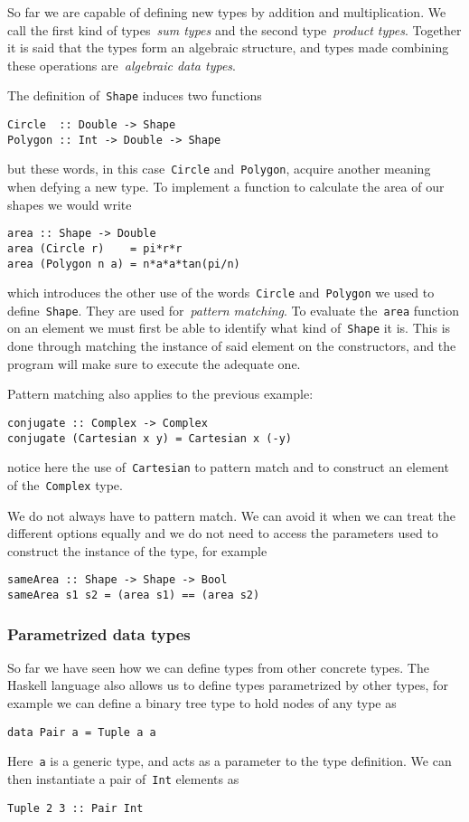\documentclass[../TFG.tex]{subfiles}
\begin{document}
So far we are capable of defining new types by addition and multiplication. We
call the first kind of types~\emph{sum types} and the second type~\emph{product
types}. Together it is said that the types form an algebraic structure, and
types made combining these operations are~\emph{algebraic data types}.

The definition of~\texttt{Shape} induces two functions
\begin{verbatim}
Circle  :: Double -> Shape
Polygon :: Int -> Double -> Shape
\end{verbatim}
but these words, in this case~\texttt{Circle}
and~\texttt{Polygon}, acquire another meaning when defying a new
type. To implement a function to calculate the area of our shapes we would write
\begin{verbatim}
area :: Shape -> Double
area (Circle r)    = pi*r*r
area (Polygon n a) = n*a*a*tan(pi/n)
\end{verbatim}
which introduces the other use of the words~\texttt{Circle}
and~\texttt{Polygon} we used to define~\texttt{Shape}.
They are used for~\emph{pattern matching}. To evaluate
the~\texttt{area} function on an element we must
first be able to identify what kind of~\texttt{Shape} it is. This
is done through matching the instance of said element on the constructors, and
the program will make sure to execute the adequate one.

Pattern matching also applies to the previous example:
\begin{verbatim}
conjugate :: Complex -> Complex
conjugate (Cartesian x y) = Cartesian x (-y)
\end{verbatim}
notice here the use of~\texttt{Cartesian} to pattern match and to
construct an element of the~\texttt{Complex} type.

We do not always have to pattern match. We can avoid it when we can treat the
different options equally and we do not need to access the parameters used to
construct the instance of the type, for example
\begin{verbatim}
sameArea :: Shape -> Shape -> Bool
sameArea s1 s2 = (area s1) == (area s2)
\end{verbatim}

\subsubsection{Parametrized data types}
So far we have seen how we can define types from other concrete types. The
Haskell language also allows us to define types parametrized by other types, for
example we can define a binary tree type to hold nodes of any type as
\begin{verbatim}
data Pair a = Tuple a a
\end{verbatim}
Here~\texttt{a} is a generic type, and acts as a parameter to the
type definition. We can then instantiate a pair
of~\texttt{Int} elements as
\begin{verbatim}
Tuple 2 3 :: Pair Int
\end{verbatim}
\end{document}
